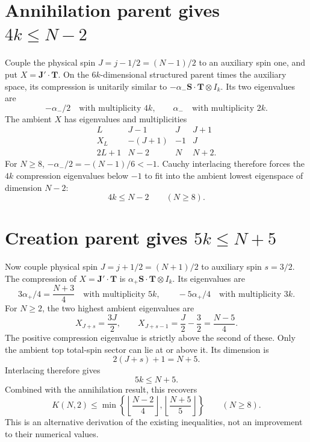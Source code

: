 \documentclass[11pt]{article}
\begin{document}
\section*{Annihilation parent gives $4k\le N-2$}
Couple the physical spin $J=j-1/2=(N-1)/2$ to an auxiliary spin one,
and put $X=\mathbf J'\cdot\mathbf T$. On the $6k$-dimensional
structured parent times the auxiliary space, its compression is unitarily
similar to $-\alpha_-\mathbf S\cdot\mathbf T\otimes I_k$.
Its two eigenvalues are
\[
 -\alpha_-/2\quad\text{with multiplicity }4k,
 \qquad \alpha_-\quad\text{with multiplicity }2k.
\]
The ambient $X$ has eigenvalues and multiplicities
\[
\begin{array}{c|ccc}
L&J-1&J&J+1\\\hline
X_L&-(J+1)&-1&J\\
2L+1&N-2&N&N+2.
\end{array}
\]
For $N\ge8$, $-\alpha_-/2=-(N-1)/6<-1$.
Cauchy interlacing therefore forces the $4k$ compression eigenvalues
below $-1$ to fit into the ambient lowest eigenspace of dimension $N-2$:
\[
 \boxed{4k\le N-2\qquad(N\ge8).}
\]

\section*{Creation parent gives $5k\le N+5$}
Now couple physical spin $J=j+1/2=(N+1)/2$ to auxiliary spin $s=3/2$.
The compression of $X=\mathbf J'\cdot\mathbf T$ is
$\alpha_+\mathbf S\cdot\mathbf T\otimes I_k$. Its eigenvalues are
\[
 3\alpha_+/4=\frac{N+3}{4}\quad\text{with multiplicity }5k,
 \qquad -5\alpha_+/4\quad\text{with multiplicity }3k.
\]
For $N\ge2$, the two highest ambient eigenvalues are
\[
 X_{J+s}=\frac{3J}{2},\qquad X_{J+s-1}=\frac J2-\frac32=\frac{N-5}{4}.
\]
The positive compression eigenvalue is strictly above the second of these.
Only the ambient top total-spin sector can lie at or above it. Its
dimension is
\[
 2(J+s)+1=N+5.
\]
Interlacing therefore gives
\[
 \boxed{5k\le N+5.}
\]
Combined with the annihilation result, this recovers
\[
 K(N,2)\le\min\left\{\left\lfloor\frac{N-2}{4}\right\rfloor,
                         \left\lfloor\frac{N+5}{5}\right\rfloor\right\}
 \qquad(N\ge8).
\]
This is an alternative derivation of the existing inequalities, not an
improvement to their numerical values.
\end{document}
